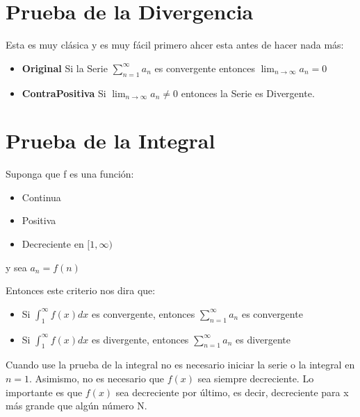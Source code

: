 \documentclass[12pt]{report}                                %
\begin{document}
    \clearpage
    \section{Prueba de la Divergencia}
        Esta es muy clásica y es muy fácil primero ahcer esta antes
        de hacer nada más:

        \begin{itemize}
            \item \textbf{Original} Si la Serie $\sum_{n=1}^{\infty} a_n$ es
            convergente entonces $\lim_{n \to \infty} a_n = 0$

            \item \textbf{ContraPositiva} Si $\lim_{n \to \infty} a_n \neq 0$ entonces la Serie es Divergente.
        \end{itemize}

    \clearpage
    \section{Prueba de la Integral}
        Suponga que f es una función:

        \begin{itemize}
            \item Continua
            \item Positiva
            \item Decreciente en $[1, \infty)$
        \end{itemize}

        y sea $a_n = f(n)$

        Entonces este criterio nos dira que:
        \begin{itemize}
           \item Si $\int_1^{\infty}f(x) dx$ es convergente, entonces $\sum_{n=1}^{\infty} a_n$ es convergente
           \item Si $\int_1^{\infty}f(x) dx$ es divergente, entonces $\sum_{n=1}^{\infty} a_n$ es divergente
        \end{itemize}

        Cuando use la prueba de la integral no es necesario iniciar la serie o la integral en $n=1$.
        Asimismo, no es necesario que $f(x)$ sea siempre decreciente.
        Lo importante es que $f(x)$ sea decreciente por último, es decir, decreciente para x más
        grande que algún número N. 
\end{document}
